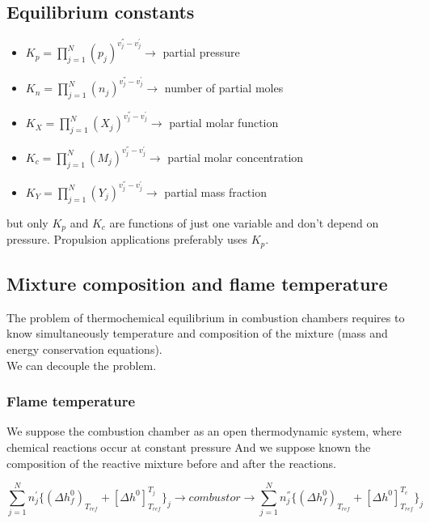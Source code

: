 \documentclass[12pt]{article}
\begin{document}
\subsection{Equilibrium constants}

\begin{itemize}
    \item $K_{p}=\prod_{j=1}^{N}(p_{j})^{{v_{j}^{''}}-{v_{j}^{'}}} \rightarrow$ partial pressure
    \item $K_{n}=\prod_{j=1}^{N}(n_{j})^{{v_{j}^{''}}-{v_{j}^{'}}} \rightarrow$ number of partial moles
    \item $K_{X}=\prod_{j=1}^{N}(X_{j})^{{v_{j}^{''}}-{v_{j}^{'}}} \rightarrow$ partial molar function
    \item $K_{c}=\prod_{j=1}^{N}(M_{j})^{{v_{j}^{''}}-{v_{j}^{'}}} \rightarrow$ partial molar concentration
    \item $K_{Y}=\prod_{j=1}^{N}(Y_{j})^{{v_{j}^{''}}-{v_{j}^{'}}} \rightarrow$ partial mass fraction
\end{itemize} 
but only $K_{p}$ and $K_{c}$ are functions of just one variable and don't depend on pressure. Propulsion applications preferably uses $K_{p}$.

\subsection{Mixture composition and flame temperature}

The problem of thermochemical equilibrium in combustion chambers requires to know simultaneously temperature and composition of the mixture (mass and energy conservation equations).\\
We can decouple the problem.

\subsubsection{Flame temperature}

We suppose the combustion chamber as an open thermodynamic system, where chemical reactions occur at constant pressure And we suppose known the composition of the reactive mixture before and after the reactions.

\begin{equation}
    \sum_{j=1}^{N}n_{j}^{'}\{(\Delta h_{f}^{0})_{T_{ref}}+[\Delta h^{0}]_{T_{ref}}^{T_{j}}\}_{j} \rightarrow
    combustor
    \rightarrow
    \sum_{j=1}^{N}n_{j}^{''}\{(\Delta h_{f}^{0})_{T_{ref}}+[\Delta h^{0}]_{T_{ref}}^{T_{c}}\}_{j}
\end{equation}
\end{document}
